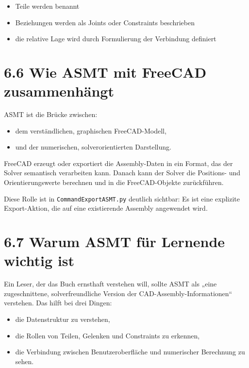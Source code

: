 \documentclass[
  12pt
]{book}
\providecommand{\tightlist}{%
  \setlength{\itemsep}{0pt}\setlength{\parskip}{0pt}}
\begin{document}
\begin{itemize}
\tightlist
\item
  Teile werden benannt
\item
  Beziehungen werden als Joints oder Constraints beschrieben
\item
  die relative Lage wird durch Formulierung der Verbindung definiert
\end{itemize}

\hypertarget{wie-asmt-mit-freecad-zusammenhuxe4ngt}{%
\section{\texorpdfstring{{6.6} Wie ASMT mit FreeCAD
zusammenhängt}{6.6 Wie ASMT mit FreeCAD zusammenhängt}}\label{wie-asmt-mit-freecad-zusammenhuxe4ngt}}

ASMT ist die Brücke zwischen:

\begin{itemize}
\tightlist
\item
  dem verständlichen, graphischen FreeCAD-Modell,
\item
  und der numerischen, solverorientierten Darstellung.
\end{itemize}

FreeCAD erzeugt oder exportiert die Assembly-Daten in ein Format, das
der Solver semantisch verarbeiten kann. Danach kann der Solver die
Positions- und Orientierungswerte berechnen und in die FreeCAD-Objekte
zurückführen.

Diese Rolle ist in \texttt{CommandExportASMT.py} deutlich sichtbar: Es
ist eine explizite Export-Aktion, die auf eine existierende Assembly
angewendet wird.

\hypertarget{warum-asmt-fuxfcr-lernende-wichtig-ist}{%
\section{\texorpdfstring{{6.7} Warum ASMT für Lernende wichtig
ist}{6.7 Warum ASMT für Lernende wichtig ist}}\label{warum-asmt-fuxfcr-lernende-wichtig-ist}}

Ein Leser, der das Buch ernsthaft verstehen will, sollte ASMT als „eine
zugeschnittene, solverfreundliche Version der
CAD-Assembly-Informationen`` verstehen. Das hilft bei drei Dingen:

\begin{itemize}
\tightlist
\item
  die Datenstruktur zu verstehen,
\item
  die Rollen von Teilen, Gelenken und Constraints zu erkennen,
\item
  die Verbindung zwischen Benutzeroberfläche und numerischer Berechnung
  zu sehen.
\end{itemize}
\end{document}
